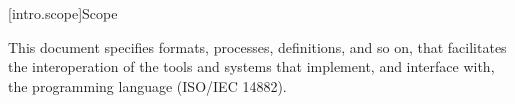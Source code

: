
[intro.scope]{Scope}

\pnum
{}%
This document specifies formats, processes, definitions, and so on, that
facilitates the interoperation of the tools and systems that implement, and
interface with, the \Cpp{} programming language (ISO/IEC 14882).



